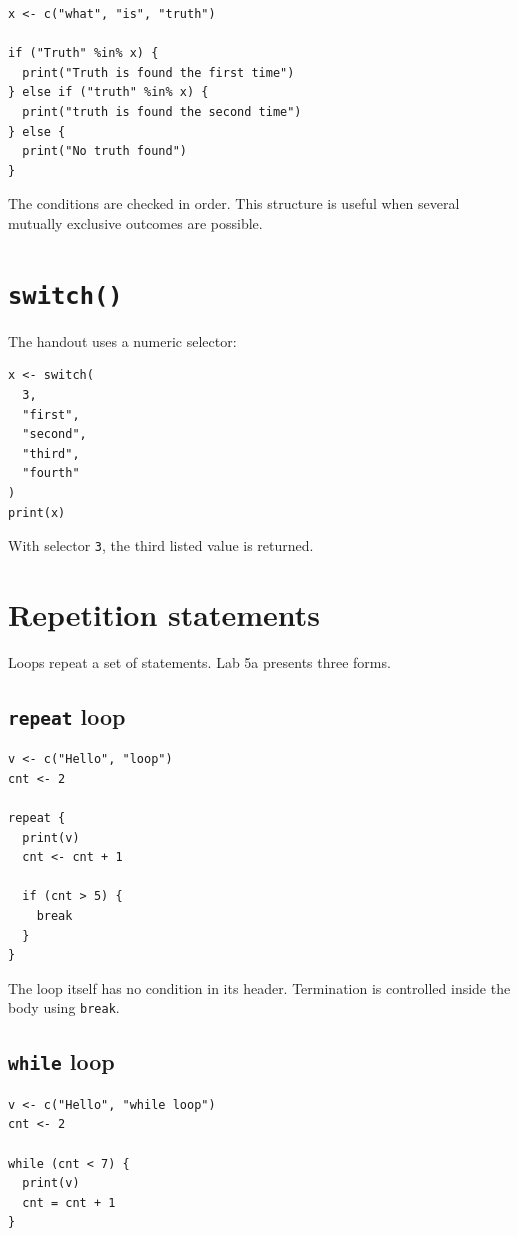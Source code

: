 \begin{lstlisting}[style=dsr]
x <- c("what", "is", "truth")

if ("Truth" %in% x) {
  print("Truth is found the first time")
} else if ("truth" %in% x) {
  print("truth is found the second time")
} else {
  print("No truth found")
}
\end{lstlisting}

The conditions are checked in order. This structure is useful when several mutually exclusive outcomes are possible.

\section{\texttt{switch()}}

The handout uses a numeric selector:

\begin{lstlisting}[style=dsr]
x <- switch(
  3,
  "first",
  "second",
  "third",
  "fourth"
)
print(x)
\end{lstlisting}

With selector \texttt{3}, the third listed value is returned.

\section{Repetition statements}

Loops repeat a set of statements. Lab 5a presents three forms.

\subsection{\texttt{repeat} loop}

\begin{lstlisting}[style=dsr]
v <- c("Hello", "loop")
cnt <- 2

repeat {
  print(v)
  cnt <- cnt + 1

  if (cnt > 5) {
    break
  }
}
\end{lstlisting}

The loop itself has no condition in its header. Termination is controlled inside the body using \texttt{break}.

\subsection{\texttt{while} loop}

\begin{lstlisting}[style=dsr]
v <- c("Hello", "while loop")
cnt <- 2

while (cnt < 7) {
  print(v)
  cnt = cnt + 1
}
\end{lstlisting}

